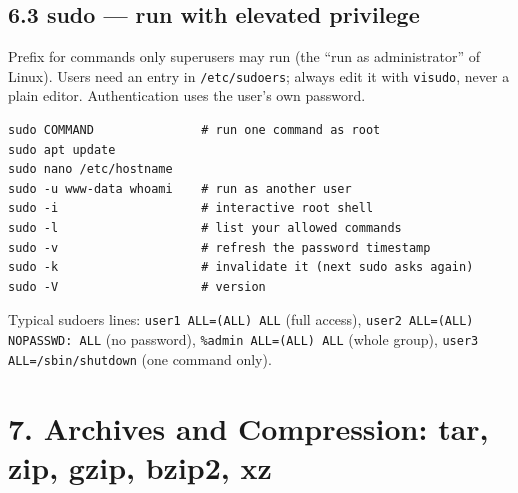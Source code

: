 \documentclass[11pt,a4paper]{article}
\newcommand{\cmd}[1]{\texttt{#1}}
\begin{document}
\subsection{6.3 sudo --- run with elevated privilege}
Prefix for commands only superusers may run (the ``run as administrator'' of Linux). Users need an entry in \cmd{/etc/sudoers}; always edit it with \cmd{visudo}, never a plain editor. Authentication uses the user's own password.
\begin{lstlisting}
sudo COMMAND               # run one command as root
sudo apt update
sudo nano /etc/hostname
sudo -u www-data whoami    # run as another user
sudo -i                    # interactive root shell
sudo -l                    # list your allowed commands
sudo -v                    # refresh the password timestamp
sudo -k                    # invalidate it (next sudo asks again)
sudo -V                    # version
\end{lstlisting}
Typical sudoers lines: \cmd{user1 ALL=(ALL) ALL} (full access), \cmd{user2 ALL=(ALL) NOPASSWD: ALL} (no password), \cmd{\%admin ALL=(ALL) ALL} (whole group), \cmd{user3 ALL=/sbin/shutdown} (one command only).

\section{7. Archives and Compression: tar, zip, gzip, bzip2, xz}
\end{document}
